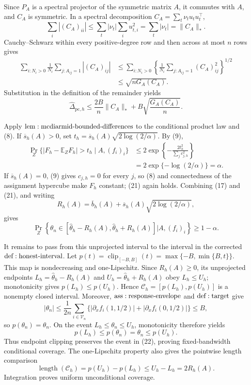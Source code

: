 Since \(P_A\) is a spectral projector of the symmetric matrix \(A\), it commutes with \(A\), and \(C_A\) is symmetric.  In a spectral decomposition \(C_A=\sum_t\nu_tu_tu_t^\top\),
\[
 \sum_i|(C_A)_{ii}|
 \leq\sum_t|\nu_t|\sum_i u_{t,i}^2
 =\sum_t|\nu_t|=\|C_A\|_*.
\tag{18}
\]
Cauchy--Schwarz within every positive-degree row and then across at most \(n\) rows gives
\[
\begin{aligned}
 \sum_{i:N_i>0}\frac1{N_i}\sum_{j:A_{ij}=1}|(C_A)_{ij}|
 &\leq\sum_{i:N_i>0}
 \left\{\frac1{N_i}\sum_{j:A_{ij}=1}(C_A)_{ij}^2\right\}^{1/2}\\
 &\leq\sqrt{nG_A(C_A)}.
\end{aligned}
\tag{19}
\]
Substitution in the definition of the remainder yields
\[
 \widehat\Delta_{\mathrm{pc},h}
 \leq\frac{2B}{n}\|C_A\|_*+B\sqrt{\frac{G_A(C_A)}n}.
\tag{20}
\]

Apply \({\rm lem:mcdiarmid\text{-}bounded\text{-}differences}\) to the conditional product law and (8).  If \(\overline s_h(A)>0\), set \(t_h=\overline s_h(A)\sqrt{2\log(2/\alpha)}\).  By (9),
\[
\begin{aligned}
 \Pr_Z\{|F_h-\mathbb E_ZF_h|>t_h\mid A,(f_i)_i\}
 &\leq2\exp\left\{-\frac{2t_h^2}{\sum_jc_{j,h}^2}\right\}\\
 &=2\exp\{-\log(2/\alpha)\}=\alpha.
\end{aligned}
\tag{21}
\]
If \(\overline s_h(A)=0\), (9) gives \(c_{j,h}=0\) for every \(j\), so (8) and connectedness of the assignment hypercube make \(F_h\) constant; (21) again holds.  Combining (17) and (21), and writing
\[
 R_h(A)=\overline b_h(A)+\overline s_h(A)\sqrt{2\log(2/\alpha)},
\]
gives
\[
 \Pr_Z\!\left\{\theta_n\in
 [\widehat\theta_h-R_h(A),\widehat\theta_h+R_h(A)]
 \mathrel{\Big|}A,(f_i)_i\right\}\geq1-\alpha.
\tag{22}
\]

It remains to pass from this unprojected interval to the interval in the corrected \({\rm def:honest\text{-}interval}\).  Let \(p(t)=\operatorname{clip}_{[-B,B]}(t)=\max\{-B,\min\{B,t\}\}\).  This map is nondecreasing and one-Lipschitz.  Since \(R_h(A)\geq0\), its unprojected endpoints \(L_h=\widehat\theta_h-R_h(A)\) and \(U_h=\widehat\theta_h+R_h(A)\) obey \(L_h\leq U_h\); monotonicity gives \(p(L_h)\leq p(U_h)\).  Hence \(\mathcal C_h=[p(L_h),p(U_h)]\) is a nonempty closed interval.  Moreover, \({\rm ass:response\text{-}envelope}\) and \({\rm def:target}\) give
\[
 |\theta_n|
 \leq\frac1{2n}\sum_{i\in\mathcal V_n}
 \{|\partial_xf_i(1,1/2)|+|\partial_xf_i(0,1/2)|\}
 \leq B,
\tag{23}
\]
so \(p(\theta_n)=\theta_n\).  On the event \(L_h\leq\theta_n\leq U_h\), monotonicity therefore yields
\[
 p(L_h)\leq p(\theta_n)=\theta_n\leq p(U_h).
\tag{24}
\]
Thus endpoint clipping preserves the event in (22), proving fixed-bandwidth conditional coverage.  The one-Lipschitz property also gives the pointwise length comparison
\[
 \operatorname{length}(\mathcal C_h)
 =p(U_h)-p(L_h)\leq U_h-L_h=2R_h(A).
\tag{25}
\]
Integration proves uniform unconditional coverage.

